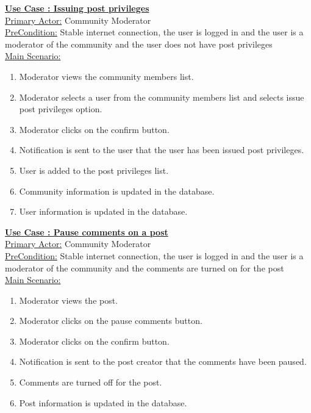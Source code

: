 \documentclass[conference,compsoc]{IEEEtran}
\newcounter{UC}
\newcommand{\nextU}{\stepcounter{UC}\theUC}
\begin{document}
\underline{\textbf{Use Case \nextU: Issuing post privileges}}\\

\underline{Primary Actor:} Community Moderator\\

\underline{PreCondition:} Stable internet connection, the user is logged in and the user is a moderator of the community and the user does not have post privileges\\

\underline{Main Scenario:}\\
\begin{enumerate}
    \item Moderator views the community members list.
    \item Moderator selects a user from the community members list and selects issue post privileges option.
    \item Moderator clicks on the confirm button.
    \item Notification is sent to the user that the user has been issued post privileges.
    \item User is added to the post privileges list.
    \item Community information is updated in the database.
    \item User information is updated in the database.
\end{enumerate}

\underline{\textbf{Use Case \nextU: Pause comments on a post}}\\

\underline{Primary Actor:} Community Moderator\\

\underline{PreCondition:} Stable internet connection, the user is logged in and the user is a moderator of the community and the comments are turned on for the post\\

\underline{Main Scenario:}\\
\begin{enumerate}
    \item Moderator views the post.
    \item Moderator clicks on the pause comments button.
    \item Moderator clicks on the confirm button.
    \item Notification is sent to the post creator that the comments have been paused.
    \item Comments are turned off for the post.
    \item Post information is updated in the database.
\end{enumerate}
\end{document}
